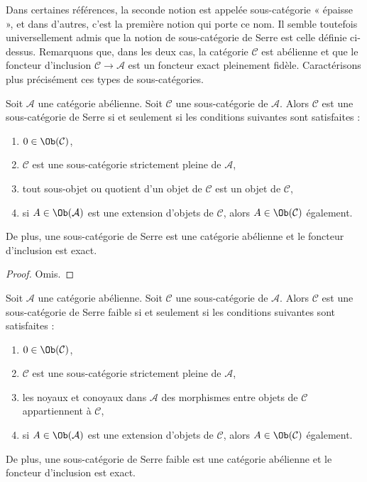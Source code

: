 \noindent
Dans certaines références, la seconde notion est appelée sous-catégorie « épaisse »,
et dans d'autres, c'est la première notion qui porte ce nom.
Il semble toutefois universellement admis que la notion de sous-catégorie de Serre
est celle définie ci-dessus. Remarquons que, dans les deux cas, la catégorie
$\mathcal{C}$ est abélienne et que le foncteur d'inclusion
$\mathcal{C} \to \mathcal{A}$ est un foncteur exact pleinement fidèle.
Caractérisons plus précisément ces types de sous-catégories.

\begin{lemma}
\label{lemma-characterize-serre-subcategory}
Soit $\mathcal{A}$ une catégorie abélienne.
Soit $\mathcal{C}$ une sous-catégorie de $\mathcal{A}$.
Alors $\mathcal{C}$ est une sous-catégorie de Serre si et seulement si
les conditions suivantes sont satisfaites :
\begin{enumerate}
\item $0 \in \Ob(\mathcal{C})$,
\item $\mathcal{C}$ est une sous-catégorie strictement pleine de $\mathcal{A}$,
\item tout sous-objet ou quotient d'un objet de $\mathcal{C}$ est un objet
de $\mathcal{C}$,
\item si $A \in \Ob(\mathcal{A})$ est une extension d'objets de $\mathcal{C}$,
alors $A \in \Ob(\mathcal{C})$ également.
\end{enumerate}
De plus, une sous-catégorie de Serre est une catégorie abélienne et
le foncteur d'inclusion est exact.
\end{lemma}

\begin{proof}
Omis.
\end{proof}

\begin{lemma}
\label{lemma-characterize-weak-serre-subcategory}
Soit $\mathcal{A}$ une catégorie abélienne.
Soit $\mathcal{C}$ une sous-catégorie de $\mathcal{A}$.
Alors $\mathcal{C}$ est une sous-catégorie de Serre faible si et seulement si
les conditions suivantes sont satisfaites :
\begin{enumerate}
\item $0 \in \Ob(\mathcal{C})$,
\item $\mathcal{C}$ est une sous-catégorie strictement pleine de $\mathcal{A}$,
\item les noyaux et conoyaux dans $\mathcal{A}$ des morphismes
entre objets de $\mathcal{C}$ appartiennent à $\mathcal{C}$,
\item si $A \in \Ob(\mathcal{A})$ est une extension d'objets de $\mathcal{C}$,
alors $A \in \Ob(\mathcal{C})$ également.
\end{enumerate}
De plus, une sous-catégorie de Serre faible est une catégorie abélienne et
le foncteur d'inclusion est exact.
\end{lemma}

